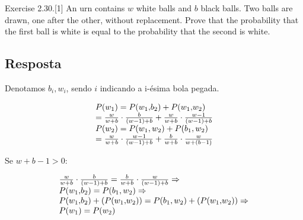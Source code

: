 \item
	Exercise 2.30.[1] An urn contains $w$ white balls and $b$ black balls. Two balls
	are drawn, one after the other, without replacement. Prove that the
	probability that the first ball is white is equal to the probability that the
	second is white.

\subsection*{Resposta}

Denotamos $b_i, w_i$, sendo $i$ indicando a i-ésima bola pegada.

\[\begin{array}{l}
P({w_1}) = P({w_1}{\rm{,}}{b_2}) + P({w_1}{\rm{,}}{w_2})\\
 = \frac{w}{{w + b}} \cdot \frac{b}{{\left( {w - 1} \right) + b}} + \frac{w}{{w + b}} \cdot \frac{{w - 1}}{{\left( {w - 1} \right) + b}}\\
P({w_2}) = P({w_1},{w_2}) + P({b_1},{w_2})\\
 = \frac{w}{{w + b}} \cdot \frac{{w - 1}}{{\left( {w - 1} \right) + b}} + \frac{b}{{w + b}} \cdot \frac{w}{{w + \left( {b - 1} \right)}}
\end{array}\]

Se $w+b-1 > 0$:

\[\begin{array}{l}
\frac{w}{{w + b}} \cdot \frac{b}{{\left( {w - 1} \right) + b}} = \frac{b}{{w + b}} \cdot \frac{w}{{\left( {w - 1} \right) + b}} \Rightarrow \\
P({w_1}{\rm{,}}{b_2}) = P({b_1},{w_2}) \Rightarrow \\
P({w_1}{\rm{,}}{b_2}) + \left( {P({w_1}{\rm{,}}{w_2})} \right) = P({b_1},{w_2}) + \left( {P({w_1}{\rm{,}}{w_2})} \right) \Rightarrow \\
P({w_1}) = P({w_2})
\end{array}\]

